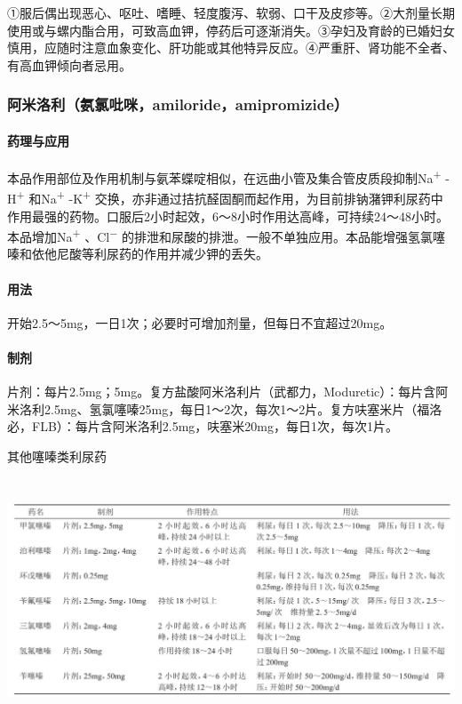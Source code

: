 ①服后偶出现恶心、呕吐、嗜睡、轻度腹泻、软弱、口干及皮疹等。②大剂量长期使用或与螺内酯合用，可致高血钾，停药后可逐渐消失。③孕妇及育龄的已婚妇女慎用，应随时注意血象变化、肝功能或其他特异反应。④严重肝、肾功能不全者、有高血钾倾向者忌用。

\subsubsection{阿米洛利（氨氯吡咪，amiloride，amipromizide）}

\paragraph{药理与应用}

本品作用部位及作用机制与氨苯蝶啶相似，在远曲小管及集合管皮质段抑制Na\textsuperscript{+}
-H\textsuperscript{+} 和Na\textsuperscript{+} -K\textsuperscript{+}
交换，亦非通过拮抗醛固酮而起作用，为目前排钠潴钾利尿药中作用最强的药物。口服后2小时起效，6～8小时作用达高峰，可持续24～48小时。本品增加Na\textsuperscript{+}
、Cl\textsuperscript{−}
的排泄和尿酸的排泄。一般不单独应用。本品能增强氢氯噻嗪和依他尼酸等利尿药的作用并减少钾的丢失。

\paragraph{用法}

开始2.5～5mg，一日1次；必要时可增加剂量，但每日不宜超过20mg。

\paragraph{制剂}

片剂：每片2.5mg；5mg。复方盐酸阿米洛利片（武都力，Moduretic）：每片含阿米洛利2.5mg、氢氯噻嗪25mg，每日1～2次，每次1～2片。复方呋塞米片（福洛必，FLB）：每片含阿米洛利2.5mg，呋塞米20mg，每日1次，每次1片。

\begin{table}[htbp]
\centering
\caption{其他噻嗪类利尿药}
\label{tab152-1}
\includegraphics[width=6.625in,height=2.86458in]{./images/Image00582.jpg}
\end{table}

